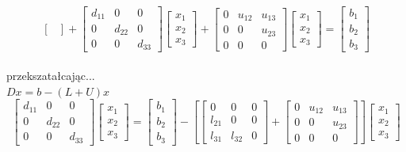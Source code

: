 \documentclass[12pt,a4paper]{article}
\begin{document}
\begin{enumerate}
\begin{equation}
\begin{bmatrix}
\end{bmatrix}+
\begin{bmatrix}
d_{11}&0&0\\
0&d_{22}&0\\
0&0&d_{33}
\end{bmatrix}
\begin{bmatrix}
x_1\\x_2\\x_3
\end{bmatrix}+
\begin{bmatrix}
0&u_{12}&u_{13}\\
0&0&u_{23}\\
0&0&0
\end{bmatrix}
\begin{bmatrix}
x_1\\x_2\\x_3
\end{bmatrix}=
\begin{bmatrix}
b_1\\b_2\\b_3
\end{bmatrix}
\end{equation}\\
przekszatałcając...\\
$Dx=b-(L+U)x$\\
\begin{equation}
\begin{bmatrix}
d_{11}&0&0\\
0&d_{22}&0\\
0&0&d_{33}
\end{bmatrix}
\begin{bmatrix}
x_1\\x_2\\x_3
\end{bmatrix}=
\begin{bmatrix}
b_1\\b_2\\b_3
\end{bmatrix}-
\left[
\begin{bmatrix}
0&0&0\\
l_{21}&0&0\\
l_{31}&l_{32}&0
\end{bmatrix}+
\begin{bmatrix}
0&u_{12}&u_{13}\\
0&0&u_{23}\\
0&0&0
\end{bmatrix}
\right]
\begin{bmatrix}
x_1\\x_2\\x_3

\end{bmatrix}
\end{equation}
\end{enumerate}
\end{document}
